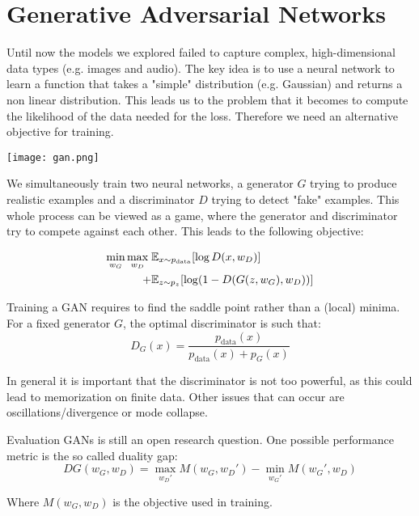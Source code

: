 \section{Generative Adversarial Networks}

Until now the models we explored failed to capture complex, high-dimensional data types (e.g. images and audio). The key idea is to use a neural network to learn a function that takes a "simple" distribution (e.g. Gaussian) and returns a non linear distribution. This leads us to the problem that it becomes to compute the likelihood of the data needed for the loss. Therefore we need an alternative objective for training.

\texttt{[image: gan.png]}

We simultaneously train two neural networks, a generator $G$ trying to produce realistic examples and a discriminator $D$ trying to detect "fake" examples. This whole process can be viewed as a game, where the generator and discriminator try to compete against each other. This leads to the following objective:

\begin{align*}
	\min_{w_G} \max_{w_D} \; & \mathbb{E}_{x \sim p_{\text{data}}} [\log D(x, w_D)] \\
 	+ &\mathbb{E}_{z \sim p_z} [\log (1 - D(G(z, w_G), w_D))]
 \end{align*}
 
 Training a GAN requires to find the saddle point rather than a (local) minima. For a fixed generator $G$, the optimal discriminator is such that:
 $$D_G(x) = \frac{p_{\text{data}}(x)}{p_{\text{data}}(x) + p_G(x)}$$
 
 In general it is important that the discriminator is not too powerful, as this could lead to memorization on finite data. Other issues that can occur are oscillations/divergence or mode collapse. \medskip
 
 Evaluation GANs is still an open research question. One possible performance metric is the so called duality gap:
 $$DG(w_G, w_D) = \max_{w_D'} M(w_G, w_D') - \min_{w_G'} M(w_G', w_D)$$
 
 Where $M(w_G, w_D)$ is the objective used in training.